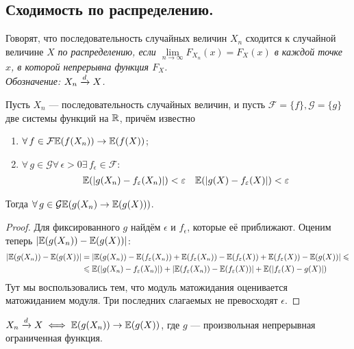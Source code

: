 \subsection{Сходимость по распределению.}
\begin{definition}
    Говорят, что последовательность случайных величин $X_n$ сходится к случайной величине $X$ \it{по распределению},
    если $\lim\limits_{n \to \infty} F_{X_n}(x) = F_X(x)$ в каждой точке $x$, в которой непрерывна функция $F_X$.\\
    Обозначение: $X_n \xrightarrow{d} X$.
\end{definition}
\begin{lemma}
    Пусть $X_n$ --- последовательность случайных величин, и пусть $\mathcal{F} = \{f\}, \mathcal{G} = \{g\}$ две
    системы функций на $\mathbb{R}$, причём известно
    \begin{enumerate}
        \item $\forall\, f \in \mathcal{F} \mathbb{E}(f(X_n)) \to \mathbb{E}(f(X))$;\\
        \item $\forall\, g \in \mathcal{G} \forall\, \epsilon > 0 \exists\, f_{\epsilon} \in \mathcal{F} \colon$
        \begin{align*}
            &\mathbb{E}(|g(X_n) - f_{\varepsilon}(X_n)|) < \varepsilon
            &\mathbb{E}(|g(X) - f_{\varepsilon}(X)|) < \varepsilon
        \end{align*}
    \end{enumerate}
    Тогда $\forall\, g \in \mathcal{G} \mathbb{E}(g(X_n) \to \mathbb{E}(g(X)))$.
\end{lemma}
\begin{proof}
    Для фиксированного $g$ найдём $\epsilon$ и $f_{\epsilon}$, которые её приближают. Оценим теперь
    $|\mathbb{E}(g(X_n)) - \mathbb{E}(g(X))|$:
    \begin{align*}
        |\mathbb{E}(g(X_n)) - \mathbb{E}(g(X))| &= |\mathbb{E}(g(X_n)) - \mathbb{E}(f_{\varepsilon}(X_n)) + \mathbb{E}(f_{\varepsilon}(X_n))
        - \mathbb{E}(f_{\varepsilon}(X)) + \mathbb{E}(f_{\varepsilon}(X)) - \mathbb{E}(g(X))| \leqslant\\
        &\leqslant \mathbb{E}(|g(X_n) - f_{\varepsilon}(X_n)|) + |\mathbb{E}(f_{\varepsilon}(X_n)) - \mathbb{E}(f_{\varepsilon}(X))| +
        \mathbb{E}(|f_{\varepsilon}(X) - g(X)|)
    \end{align*}
    Тут мы воспользовались тем, что модуль матожидания оценивается матожиданием модуля. Три последних слагаемых
    не превосходят $\epsilon$.
\end{proof}
\begin{theorem}
    $X_n \xrightarrow{d} X \iff \mathbb{E}(g(X_n)) \to \mathbb{E}(g(X))$, где $g$ --- произвольная непрерывная ограниченная функция.
\end{theorem}
